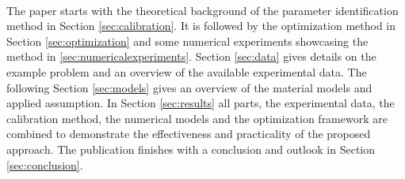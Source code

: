 \\
The paper starts  with the theoretical background of the parameter identification method in Section \ref{sec:calibration}.
It is followed by the optimization method in Section \ref{sec:optimization} and some numerical experiments showcasing the method in \ref{sec:numericalexperiments}.
Section \ref{sec:data} gives details on the example problem and an overview of the available experimental data.
The following Section \ref{sec:models} gives an overview of the material models and applied assumption. 
In Section \ref{sec:results} all parts, the experimental data, the calibration method, the numerical models and the optimization framework are combined to demonstrate the effectiveness and practicality of the proposed approach.
The publication finishes with a conclusion and outlook in Section \ref{sec:conclusion}.
